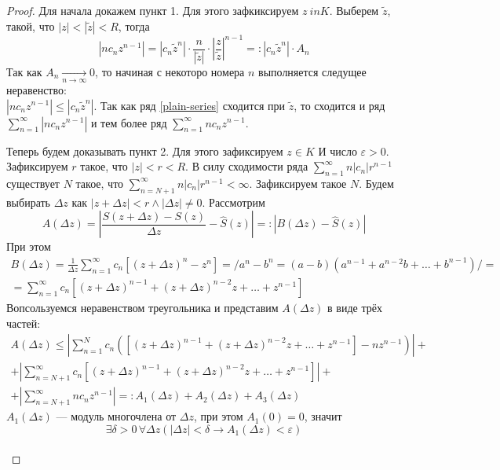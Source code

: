 \begin{proof}
Для начала докажем пункт 1. Для этого зафкиксируем \(z\ in K\). Выберем \(\widetilde{z}\), такой, что \(|z| < |\widetilde{z}| < R\), тогда
\[|n c_n z^{n-1}| = |c_n \widetilde{z}^n| \cdot \frac{n}{|\widetilde{z}|} \cdot \left| \frac{z}{\widetilde{z}} \right|^{n-1} =: |c_n \widetilde{z}^n| \cdot A_n\]
Так как \(A_n \xrightarrow[n \to \infty]{} 0\), то начиная с некоторо номера \(n\) выполняется следущее неравенство:\\
\(|n c_n z^{n-1}| \leqslant |c_n \widetilde{z}^n|\). Так как ряд \ref{plain-series} сходится при \(\widetilde{z}\), то сходится и ряд \(\sum\limits_{n=1}^\infty |n c_n z^{n-1}|\) и тем более ряд \(\sum\limits_{n=1}^\infty n c_n z^{n-1}\).

Теперь будем доказывать пункт 2. Для этого зафиксируем \(z \in K\) И число \(\varepsilon > 0\). Зафиксируем \(r\) такое, что \(|z| < r < R\). В силу сходимости ряда \(\sum\limits_{n=1}^\infty n |c_n|r^{n-1}\) существует \(N\) такое, что \(\sum\limits_{n=N+1}^\infty n |c_n|r^{n-1} < \infty\). Зафиксируем такое \(N\). Будем выбирать \(\Delta z\) как \(|z +\Delta z| < r \wedge |\Delta z| \neq 0\). Рассмотрим
\[A(\Delta z) = \left|\frac{S(z + \Delta z) - S(z)}{\Delta z} - \widehat{S}(z) \right| =: \left|B(\Delta z) - \widehat{S}(z) \right|\]
При этом 
\begin{multline*}
B(\Delta z) = \frac{1}{\Delta z} \sum\limits_{n=1}^\infty c_n \left[(z + \Delta z)^n - z^n \right] = \biggr/a^n - b^n = (a-b)(a^{n-1} + a^{n-2}b + \ldots + b^{n-1}) \biggr/ =\\
=\sum\limits_{n=1}^\infty c_n \left[(z + \Delta z)^{n-1} + (z + \Delta z)^{n-2}z + \ldots + z^{n-1} \right]
\end{multline*}
Вопсользуемся неравенством треугольника и представим \(A(\Delta z)\) в виде трёх частей:
\begin{align*}
     A(\Delta z) \leqslant \left| \sum\limits_{n=1}^N c_n \left( \left[(z + \Delta z)^{n-1} + (z + \Delta z)^{n-2}z + \ldots + z^{n-1} \right] - nz^{n-1} \right) \right| +\\
     + \left| \sum\limits_{n=N+1}^\infty c_n \left[(z + \Delta z)^{n-1} + (z + \Delta z)^{n-2}z + \ldots + z^{n-1} \right] \right| + \\
     + \left| \sum\limits_{n=N+1}^\infty n c_n z^{n-1} \right| =: A_1(\Delta z) + A_2(\Delta z) + A_3(\Delta z)
\end{align*}
\(A_1(\Delta z)\) --- модуль многочлена от \(\Delta z\), при этом \(A_1(0) = 0\), значит
\[\exists \delta > 0\,\forall \Delta z \left(|\Delta z| < \delta \rightarrow A_1(\Delta z) < \varepsilon \right)\] \\

\end{proof}
